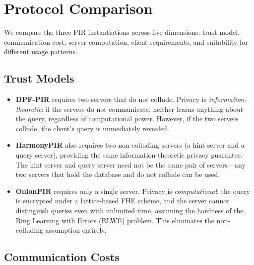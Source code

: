 \section{Protocol Comparison}
\label{sec:comparison}

We compare the three PIR instantiations across five dimensions: trust model, communication cost, server computation, client requirements, and suitability for different usage patterns.

\subsection{Trust Models}

\begin{itemize}[nolistsep,leftmargin=*]
    \item \textbf{DPF-PIR} requires two servers that do not collude. Privacy is \emph{information-theoretic}: if the servers do not communicate, neither learns anything about the query, regardless of computational power. However, if the two servers collude, the client's query is immediately revealed.

    \item \textbf{HarmonyPIR} also requires two non-colluding servers (a hint server and a query server), providing the same information-theoretic privacy guarantee. The hint server and query server need not be the same pair of servers---any two servers that hold the database and do not collude can be used.

    \item \textbf{OnionPIR} requires only a single server. Privacy is \emph{computational}: the query is encrypted under a lattice-based FHE scheme, and the server cannot distinguish queries even with unlimited time, assuming the hardness of the Ring Learning with Errors (RLWE) problem. This eliminates the non-colluding assumption entirely.
\end{itemize}

\subsection{Communication Costs}

